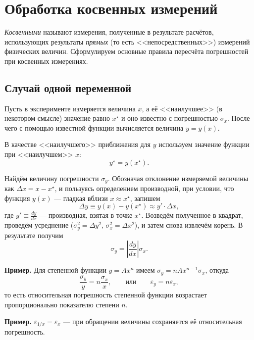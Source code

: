 \section{Обработка косвенных измерений\label{sec:kosv}}

\emph{Косвенными} называют измерения, полученные в результате расчётов,
использующих результаты \emph{прямых} (то есть <<непосредственных>>)
измерений физических величин. Сформулируем основные правила пересчёта
погрешностей при косвенных измерениях.

\subsection{Случай одной переменной}

Пусть в эксперименте измеряется величина $x$, а её <<наилучшее>>
(в некотором смысле) значение равно $x^{\star}$ и оно известно с
погрешностью $\sigma_{x}$. После чего с помощью известной функции
вычисляется величина $y=y\!\left(x\right)$.

В качестве <<наилучшего>> приближения для
$y$ используем значение функции при <<наилучшем>>
$x$:
\[
y^{\star}=y\!\left(x^{\star}\right).
\]

Найдём величину погрешности $\sigma_{y}$. Обозначая отклонение измеряемой
величины как $\Delta x=x-x^{\star}$, и пользуясь определением производной,
при условии, что функция $y\left(x\right)$ --- гладкая
вблизи $x\approx x^{\star}$, запишем 
\[
\Delta y\equiv y\left(x\right)-y\left(x^{\star}\right)\approx y'\cdot\Delta x,
\]
где $y'\equiv\frac{dy}{dx}$ --- производная, взятая в точке
$x^{\star}$. Возведём полученное в квадрат, проведём усреднение ($\sigma_{y}^{2}=\overline{\Delta y^{2}}$,
$\sigma_{x}^{2}=\overline{\Delta x^{2}}$), и затем снова извлечём
корень. В результате получим
\begin{equation}
\boxed{{\sigma_{y}=\left|\frac{dy}{dx}\right|\sigma_{x}.}}\label{eq:sxy}
\end{equation}

{\footnotesize
\textbf{Пример.} Для степенной функции
$y=Ax^{n}$ имеем $\sigma_{y}=nAx^{n-1}\sigma_{x}$, откуда 
\[
\frac{\sigma_{y}}{y}=n\frac{\sigma_{x}}{x},\qquad\text{или}\qquad\varepsilon_{y}=n\varepsilon_{x},
\]
то есть относительная погрешность степенной функции возрастает пропорционально
показателю степени $n$.\par
}%

{\footnotesize
\textbf{Пример.} $\varepsilon_{1/x}=\varepsilon_{x}$
--- при обращении величины сохраняется её относительная
погрешность.\par
}%

